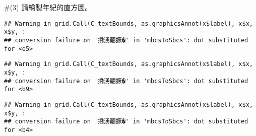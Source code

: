 \documentclass[
]{article}
\newenvironment{Shaded}{\begin{snugshade}}{\end{snugshade}}
\newcommand{\DataTypeTok}[1]{\textcolor[rgb]{0.13,0.29,0.53}{#1}}
\newcommand{\DecValTok}[1]{\textcolor[rgb]{0.00,0.00,0.81}{#1}}
\newcommand{\FloatTok}[1]{\textcolor[rgb]{0.00,0.00,0.81}{#1}}
\newcommand{\KeywordTok}[1]{\textcolor[rgb]{0.13,0.29,0.53}{\textbf{#1}}}
\newcommand{\NormalTok}[1]{#1}
\newcommand{\OperatorTok}[1]{\textcolor[rgb]{0.81,0.36,0.00}{\textbf{#1}}}
\newcommand{\OtherTok}[1]{\textcolor[rgb]{0.56,0.35,0.01}{#1}}
\newcommand{\StringTok}[1]{\textcolor[rgb]{0.31,0.60,0.02}{#1}}
\begin{document}
\#(3) 請繪製年紀的直方圖。

\begin{Shaded}
\end{Shaded}

\begin{verbatim}
## Warning in grid.Call(C_textBounds, as.graphicsAnnot(x$label), x$x, x$y, :
## conversion failure on '撟湧翩撅�' in 'mbcsToSbcs': dot substituted for <e5>
\end{verbatim}

\begin{verbatim}
## Warning in grid.Call(C_textBounds, as.graphicsAnnot(x$label), x$x, x$y, :
## conversion failure on '撟湧翩撅�' in 'mbcsToSbcs': dot substituted for <b9>
\end{verbatim}

\begin{verbatim}
## Warning in grid.Call(C_textBounds, as.graphicsAnnot(x$label), x$x, x$y, :
## conversion failure on '撟湧翩撅�' in 'mbcsToSbcs': dot substituted for <b4>
\end{verbatim}
\end{document}
